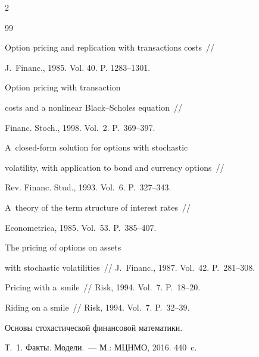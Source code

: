 \begin{multicols}{2}
{{\begin{thebibliography}{99}

 Option pricing and replication with transactions costs~// 

J.~Financ., 1985. Vol. 40. P. 1283--1301.




 Option pricing with transaction 

costs and a nonlinear Black--Scholes equation~// 

Financ. Stoch., 1998. Vol.~2. P.~369--397.




 A~closed-form solution for options with stochastic

 volatility, with application to bond and currency options~// 

 Rev. Financ. Stud., 1993. Vol.~6. P.~327--343.





A~theory of the term structure of interest rates~// 

Econometrica, 1985. Vol.~53. P.~385--407.




 The pricing of options on assets 

with stochastic volatilities~// J.~Financ., 1987. Vol.~42. P.~281--308.





Pricing with a~smile~// Risk, 1994. Vol.~7. P.~18--20.




 Riding on a smile~// Risk, 1994. Vol.~7. P.~32--39.




 Основы стохастической финансовой математики.

 Т.~1. Факты. Модели.~--- М.: МЦНМО, 2016. 440~c.





\end{thebibliography}}}
\end{multicols}
